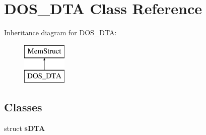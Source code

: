 \hypertarget{classDOS__DTA}{\section{D\-O\-S\-\_\-\-D\-T\-A Class Reference}
\label{classDOS__DTA}
}
Inheritance diagram for D\-O\-S\-\_\-\-D\-T\-A\-:\begin{figure}[H]
\begin{center}
\leavevmode
\includegraphics[height=2.000000cm]{classDOS__DTA}
\end{center}
\end{figure}
\subsection*{Classes}
\begin{DoxyCompactItemize}
\item 
struct {\bfseries s\-D\-T\-A}
\end{DoxyCompactItemize}
